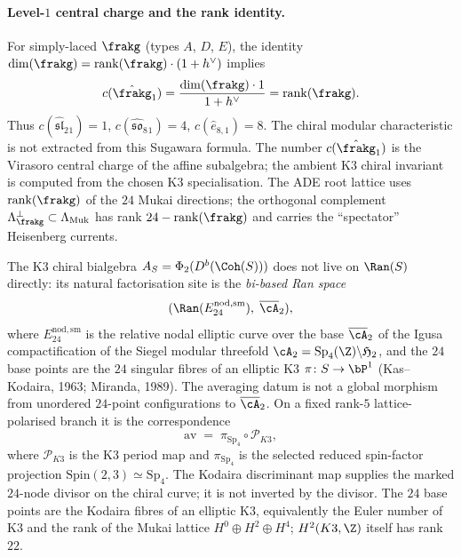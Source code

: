 \paragraph{Level-\texorpdfstring{$1$}{1} central charge and the rank identity.}
For simply-laced $\frakg$ (types $A$, $D$, $E$), the identity $\dim(\frakg) = \mathrm{rank}(\frakg) \cdot (1 + h^\vee)$ implies
\[
 c(\hat{\frakg}_1) = \frac{\dim(\frakg) \cdot 1}{1 + h^\vee} = \mathrm{rank}(\frakg).
\]
Thus $c(\hat{\mathfrak{sl}}_2{}_1) = 1$, $c(\hat{\mathfrak{so}}_8{}_1) = 4$, $c(\hat{e}_{8,1}) = 8$. The chiral modular characteristic is
not extracted from this Sugawara formula. The number $c(\hat{\frakg}_1)$ is the Virasoro central charge of the affine subalgebra; the ambient K3 chiral invariant is computed from the chosen K3 specialisation. The ADE root lattice uses $\mathrm{rank}(\frakg)$ of the $24$ Mukai directions; the orthogonal complement $\Lambda_\frakg^\perp \subset \Lambda_{\mathrm{Muk}}$ has rank $24 - \mathrm{rank}(\frakg)$ and carries the ``spectator'' Heisenberg currents.

\begin{remark}
\label{rem:gl-bi-based-ran}
The K3 chiral bialgebra $A_S = \Phi_2(D^b(\Coh(S)))$ does not live on $\Ran(S)$ directly: its natural factorisation site is the \emph{bi-based Ran space}
\[
 (\Ran(E^{\mathrm{nod,sm}}_{24}),\; \overline{\cA}_2),
\]
where $E^{\mathrm{nod,sm}}_{24}$ is the relative nodal elliptic curve over the base $\overline{\cA}_2$ of the Igusa compactification of the Siegel modular threefold $\cA_2 = \mathrm{Sp}_4(\Z)\backslash\mathfrak{H}_2$, and the $24$ base points are the $24$ singular fibres of an elliptic K3 $\pi\colon S \to \bP^1$ (Kas--Kodaira, 1963; Miranda, 1989). The averaging datum is not a global morphism from unordered \(24\)-point configurations to \(\overline{\cA}_2\). On a fixed rank-\(5\) lattice-polarised branch it is the correspondence
\[
 \mathrm{av} \;=\; \pi_{\mathrm{Sp}_4}\circ\mathscr P_{K3},
\]
where \(\mathscr P_{K3}\) is the K3 period map and \(\pi_{\mathrm{Sp}_4}\) is the selected reduced spin-factor projection \(\mathrm{Spin}(2,3)\simeq\mathrm{Sp}_4\). The Kodaira discriminant map supplies the marked \(24\)-node divisor on the chiral curve; it is not inverted by the divisor. The \(24\) base points are the Kodaira fibres of an elliptic K3, equivalently the Euler number of K3 and the rank of the Mukai lattice \(H^0\oplus H^2\oplus H^4\); \(H^2(K3,\Z)\) itself has rank \(22\).
\end{remark}

